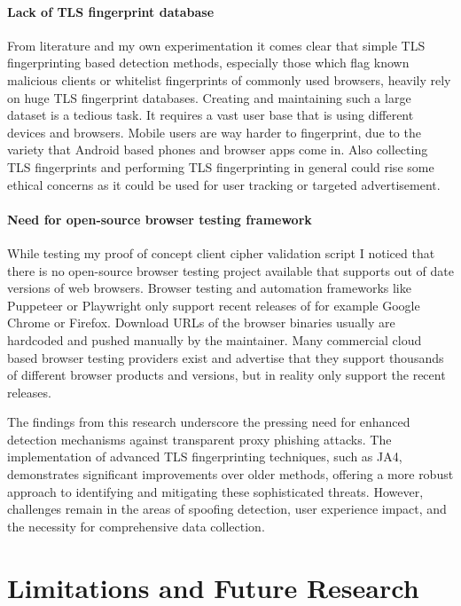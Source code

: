 \documentclass[12pt]{scrbook}
\begin{document}
\paragraph{Lack of TLS fingerprint database}
From literature and my own experimentation it comes clear that simple TLS fingerprinting
based detection methods, especially those which flag known malicious clients or whitelist
fingerprints of commonly used browsers, heavily rely on huge TLS fingerprint databases.
Creating and maintaining such a large dataset is a tedious task. It requires a vast user base
that is using different devices and browsers. Mobile users are way harder to fingerprint, due to the
variety that Android based phones and browser apps come in. Also collecting TLS fingerprints and
performing TLS fingerprinting in general could rise some ethical concerns as it could be used
for user tracking or targeted advertisement.

\paragraph{Need for open-source browser testing framework}
While testing my proof of concept client cipher validation script I noticed that there is no
open-source browser testing project available that supports out of date versions of web browsers.
Browser testing and automation frameworks like Puppeteer or Playwright only support recent releases
of for example Google Chrome or Firefox. Download URLs of the browser binaries usually are hardcoded
and pushed manually by the maintainer. Many commercial cloud based browser testing providers exist and
advertise that they support thousands of different browser products and versions, but in reality only support
the recent releases.

The findings from this research underscore the pressing need for enhanced detection mechanisms against transparent proxy phishing attacks. The implementation of advanced TLS fingerprinting techniques, such as JA4, demonstrates significant improvements over older methods, offering a more robust approach to identifying and mitigating these sophisticated threats. However, challenges remain in the areas of spoofing detection, user experience impact, and the necessity for comprehensive data collection.


\section{Limitations and Future Research}
\end{document}
